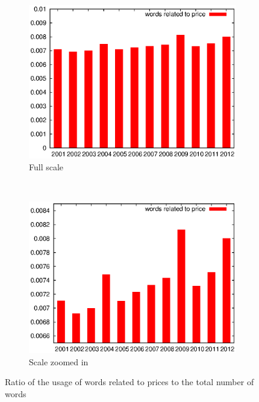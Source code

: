     \begin{figure}[H]
      \centering
      \begin{subfigure}[H]{0.7\textwidth}
        \includegraphics[width=\textwidth]{chapters/03_implementation/yearly_price1}
        \caption{Full scale}
        \label{fig:dist_price_year_1}
      \end{subfigure}
      \\
      \begin{subfigure}[H]{0.7\textwidth}
        \includegraphics[width=\textwidth]{chapters/03_implementation/yearly_price2}
        \caption{Scale zoomed in}
        \label{fig:dist_price_year_2}
      \end{subfigure}
      \caption{Ratio of the usage of words related to prices to the total number of words}
      \label{fig:dist_price_year}
    \end{figure}
    
